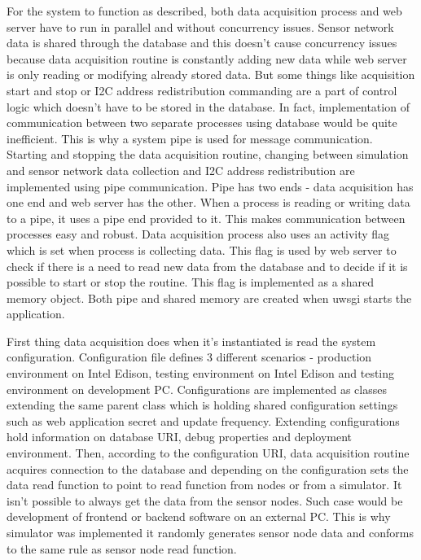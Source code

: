 For the system to function as described, both data acquisition process and web server have to run in parallel and without concurrency issues. Sensor network data is shared through the database and this doesn't cause concurrency issues because data acquisition routine is constantly adding new data while web server is only reading or modifying already stored data. But some things like acquisition start and stop or \ac{I2C} address redistribution commanding are a part of control logic which doesn't have to be stored in the database. In fact, implementation of communication between two separate processes using database would be quite inefficient. This is why a system pipe is used for message communication. Starting and stopping the data acquisition routine, changing between simulation and sensor network data collection and \ac{I2C} address redistribution are implemented using pipe communication. Pipe has two ends - data acquisition has one end and web server has the other. When a process is reading or writing data to a pipe, it uses a pipe end provided to it. This makes communication between processes easy and robust. Data acquisition process also uses an activity flag which is set when process is collecting data. This flag is used by web server to check if there is a need to read new data from the database and to decide if it is possible to start or stop the routine. This flag is implemented as a shared memory object. Both pipe and shared memory are created when uwsgi starts the application.

First thing data acquisition does when it's instantiated is read the system configuration. Configuration file defines 3 different scenarios - production environment on Intel Edison, testing environment on Intel Edison and testing environment on development \ac{PC}. Configurations are implemented as classes extending the same parent class which is holding shared configuration settings such as web application secret and update frequency. Extending configurations hold information on database \ac{URI}, debug properties and deployment environment. Then, according to the configuration \ac{URI}, data acquisition routine acquires connection to the database and depending on the configuration sets the data read function to point to read function from nodes or from a simulator. It isn't possible to always get the data from the sensor nodes. Such case would be development of frontend or backend software on an external \ac{PC}. This is why simulator was implemented it randomly generates sensor node data and conforms to the same rule as sensor node read function.

